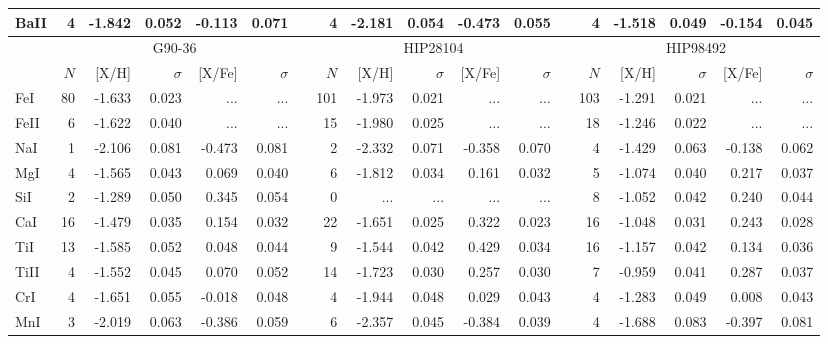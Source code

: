 \documentclass{aa}
\begin{document}
\begin{appendix}
\begin{landscape}
\begin{longtable}{lrrrrrrrrrrrrrrrrr}
BaII &      4&    -1.842&     0.052&    -0.113&     0.071&&      4&    -2.181&     0.054&    -0.473&     0.055&&      4&    -1.518&     0.049&    -0.154&     0.045\\\hline\hline
     &                     \multicolumn{5}{c}{G90-36    }&&                     \multicolumn{5}{c}{HIP28104  }&&                     \multicolumn{5}{c}{HIP98492  }\\\cline{2-6}\cline{8-12}\cline{14-18}
     & $N$ & [{X}/{H}] & $\sigma$ & [{X}/{Fe}] & $\sigma$&& $N$ & [{X}/{H}] & $\sigma$ & [{X}/{Fe}] & $\sigma$&& $N$ & [{X}/{H}] & $\sigma$ & [{X}/{Fe}] & $\sigma$\\\hline
FeI  &     80&    -1.633&     0.023&       ...&       ...&&    101&    -1.973&     0.021&       ...&       ...&&    103&    -1.291&     0.021&       ...&       ...\\
FeII &      6&    -1.622&     0.040&       ...&       ...&&     15&    -1.980&     0.025&       ...&       ...&&     18&    -1.246&     0.022&       ...&       ...\\
NaI  &      1&    -2.106&     0.081&    -0.473&     0.081&&      2&    -2.332&     0.071&    -0.358&     0.070&&      4&    -1.429&     0.063&    -0.138&     0.062\\
MgI  &      4&    -1.565&     0.043&     0.069&     0.040&&      6&    -1.812&     0.034&     0.161&     0.032&&      5&    -1.074&     0.040&     0.217&     0.037\\
SiI  &      2&    -1.289&     0.050&     0.345&     0.054&&      0&       ...&       ...&       ...&       ...&&      8&    -1.052&     0.042&     0.240&     0.044\\
CaI  &     16&    -1.479&     0.035&     0.154&     0.032&&     22&    -1.651&     0.025&     0.322&     0.023&&     16&    -1.048&     0.031&     0.243&     0.028\\
TiI  &     13&    -1.585&     0.052&     0.048&     0.044&&      9&    -1.544&     0.042&     0.429&     0.034&&     16&    -1.157&     0.042&     0.134&     0.036\\
TiII &      4&    -1.552&     0.045&     0.070&     0.052&&     14&    -1.723&     0.030&     0.257&     0.030&&      7&    -0.959&     0.041&     0.287&     0.037\\
CrI  &      4&    -1.651&     0.055&    -0.018&     0.048&&      4&    -1.944&     0.048&     0.029&     0.043&&      4&    -1.283&     0.049&     0.008&     0.043\\
MnI  &      3&    -2.019&     0.063&    -0.386&     0.059&&      6&    -2.357&     0.045&    -0.384&     0.039&&      4&    -1.688&     0.083&    -0.397&     0.081\\

\end{longtable}
\end{landscape}
\end{appendix}
\end{document}
